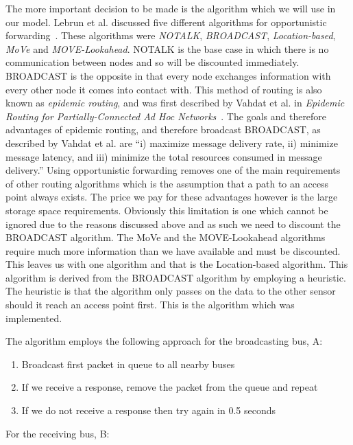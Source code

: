         The more important decision to be made is the algorithm which we will use in our model. Lebrun et al. discussed five different algorithms for opportunistic forwarding~\cite{opportunisticforwarding}. These algorithms were \emph{NOTALK}, \emph{BROADCAST}, \emph{Location-based}, \emph{MoVe} and \emph{MOVE-Lookahead}. NOTALK is the base case in which there is no communication between nodes and so will be discounted immediately. BROADCAST is the opposite in that every node exchanges information with every other node it comes into contact with. This method of routing is also known as \emph{epidemic routing}, and was first described by Vahdat et al. in \emph{Epidemic Routing for Partially-Connected Ad Hoc Networks}~\cite{vahdat2000epidemic}. The goals and therefore advantages of epidemic routing, and therefore broadcast BROADCAST, as described by Vahdat et al. are ``i) maximize message delivery rate, ii) minimize message latency, and iii) minimize the total resources consumed in message delivery.'' Using opportunistic forwarding removes one of the main requirements of other routing algorithms which is the assumption that a path to an access point always exists. The price we pay for these advantages however is the large storage space requirements. Obviously this limitation is one which cannot be ignored due to the reasons discussed above and as such we need to discount the BROADCAST algorithm. The MoVe and the MOVE-Lookahead algorithms require much more information than we have available and must be discounted. This leaves us with one algorithm and that is the Location-based algorithm. This algorithm is derived from the BROADCAST algorithm by employing a heuristic. The heuristic is that the algorithm only passes on the data to the other sensor should it reach an access point first. This is the algorithm which was implemented. 

        The algorithm employs the following approach for the broadcasting bus, A:

        \begin{enumerate}
            \item Broadcast first packet in queue to all nearby buses
            \item If we receive a response, remove the packet from the queue and repeat
            \item If we do not receive a response then try again in 0.5 seconds
        \end{enumerate}

        For the receiving bus, B:

